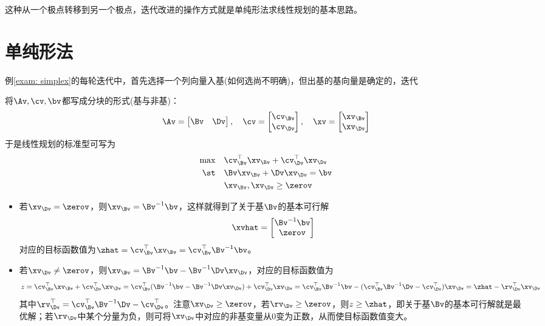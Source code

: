 \documentclass{ctexart}
\begin{document}
这种从一个极点转移到另一个极点，迭代改进的操作方式就是单纯形法求线性规划的基本思路。

\section{单纯形法}

例\ref{exam: simplex}的每轮迭代中，首先选择一个列向量入基(如何选尚不明确)，但出基的基向量是确定的，迭代

将$\Av, \cv, \bv$都写成分块的形式(基与非基)：
\begin{align*}
    \Av = \begin{bmatrix} \Bv & \Dv \end{bmatrix}, \quad \cv = \begin{bmatrix} \cv_\Bv \\ \cv_\Dv \end{bmatrix}, \quad \xv = \begin{bmatrix} \xv_\Bv \\ \xv_\Dv \end{bmatrix}
\end{align*}
于是线性规划的标准型可写为
\begin{align*}
    \max \quad & \cv_\Bv^\top \xv_\Bv + \cv_\Dv^\top \xv_\Dv \\
    \st  \quad & \Bv \xv_\Bv + \Dv \xv_\Dv = \bv             \\
               & \xv_\Bv, \xv_\Dv \ge \zerov
\end{align*}
\begin{itemize}
    \item 若$\xv_\Dv = \zerov$，则$\xv_\Bv = \Bv^{-1} \bv$，这样就得到了关于基$\Bv$的基本可行解
          \begin{align*}
              \xvhat = \begin{bmatrix} \Bv^{-1} \bv \\ \zerov \end{bmatrix}
          \end{align*}
          对应的目标函数值为$\zhat = \cv_\Bv^\top \xv_\Bv = \cv_\Bv^\top \Bv^{-1} \bv$。
    \item 若$\xv_\Dv \ne \zerov$，则$\xv_\Bv = \Bv^{-1} \bv - \Bv^{-1} \Dv \xv_\Dv$，对应的目标函数值为
          \begin{align*}
              z = \cv_\Bv^\top \xv_\Bv + \cv_\Dv^\top \xv_\Dv = \cv_\Bv^\top (\Bv^{-1} \bv - \Bv^{-1} \Dv \xv_\Dv) + \cv_\Dv^\top \xv_\Dv = \cv_\Bv^\top \Bv^{-1} \bv - (\cv_\Bv^\top \Bv^{-1} \Dv - \cv_\Dv^\top) \xv_\Dv = \zhat - \rv_\Dv^\top \xv_\Dv
          \end{align*}
          其中$\rv_\Dv^\top = \cv_\Bv^\top \Bv^{-1} \Dv - \cv_\Dv^\top$。注意$\xv_\Dv \ge \zerov$，若$\rv_\Dv \ge \zerov$，则$z \ge \zhat$，即关于基$\Bv$的基本可行解就是最优解；若$\rv_\Dv$中某个分量为负，则可将$\xv_\Dv$中对应的非基变量从$0$变为正数，从而使目标函数值变大。
\end{itemize}
\end{document}
